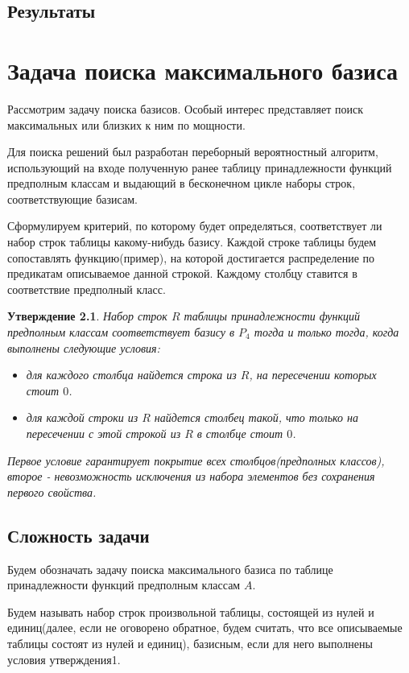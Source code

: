 \documentclass[a4paper,14pt]{extreport}
\newtheorem{utv}{Утверждение}
\begin{document}
\section{Результаты}

\newpage
\chapter{Задача поиска максимального базиса}
Рассмотрим задачу поиска базисов. Особый интерес представляет поиск максимальных или близких к ним по мощности. 

Для поиска решений был разработан переборный вероятностный алгоритм, использующий на входе полученную ранее таблицу принадлежности функций предполным классам и выдающий в бесконечном цикле наборы строк, соответствующие базисам. 

Сформулируем критерий, по которому будет определяться, соответствует ли набор строк таблицы какому-нибудь базису.
Каждой строке таблицы будем сопоставлять функцию(пример), на которой достигается распределение по предикатам описываемое данной строкой. Каждому столбцу ставится в соответствие предполный класс.  
\begin{utv}
Набор строк $R$ таблицы принадлежности функций предполным классам соответствует базису в $P_4$ тогда и только тогда, когда выполнены следующие условия:
\begin{itemize}
\item для каждого столбца найдется строка из $R$, на пересечении которых стоит $0$.    
\item для каждой строки из $R$ найдется столбец такой, что только на пересечении с этой строкой из $R$ в столбце стоит $0$.   
\end{itemize}
Первое условие гарантирует покрытие всех столбцов(предполных классов), второе - невозможность исключения из набора элементов без сохранения первого свойства. 
\end{utv}

\section{Сложность задачи}
Будем обозначать задачу поиска максимального базиса по таблице принадлежности функций предполным классам $A$.

Будем называть набор строк произвольной таблицы, состоящей из нулей и единиц(далее, если не оговорено обратное, будем считать, что все описываемые таблицы состоят из нулей и единиц), базисным, если для него выполнены условия утверждения1.
\end{document}
